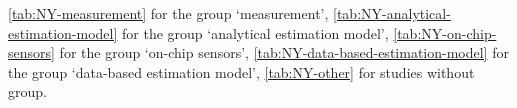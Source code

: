 \ref{tab:NY-measurement} for the group `measurement', \ref{tab:NY-analytical-estimation-model} for the group `analytical estimation model', \ref{tab:NY-on-chip-sensors} for the group `on-chip sensors', \ref{tab:NY-data-based-estimation-model} for the group `data-based estimation model', \ref{tab:NY-other} for studies without group.%